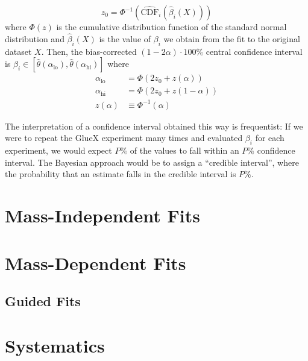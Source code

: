 \begin{equation}
  z_0 = \Phi^{-1}\left(\hat{\text{CDF}}_i(\hat{\beta}_i(X))\right)
\end{equation}
where $\Phi(z)$ is the cumulative distribution function of the standard normal distribution and $\hat{\beta}_i(X)$ is the value of $\beta_i$ we obtain from the fit to the original dataset $X$. Then, the bias-corrected $(1-2\alpha)\cdot 100\%$ central confidence interval is $\beta_i \in \left[\hat{\theta}(\alpha_\text{lo}),\hat{\theta}(\alpha_\text{hi})\right]$ where
\begin{align}
  \alpha_\text{lo} &= \Phi\left(2z_0 + z(\alpha)\right) \\
  \alpha_\text{hi} &= \Phi\left(2z_0 + z(1-\alpha)\right) \\
  z(\alpha) &\equiv \Phi^{-1}(\alpha)
\end{align}

The interpretation of a confidence interval obtained this way is frequentist: If we were to repeat the GlueX experiment many times and evaluated $\beta_i$ for each experiment, we would expect $P\%$ of the values to fall within an $P\%$ confidence interval. The Bayesian approach would be to assign a ``credible interval'', where the probability that an estimate falls in the credible interval is $P\%$.

\section{Mass-Independent Fits}\label{sec:mass-independent-fits}
\section{Mass-Dependent Fits}\label{sec:mass-dependent-fits}
\subsection{Guided Fits}\label{sub:guided-fits}
\section{Systematics}
